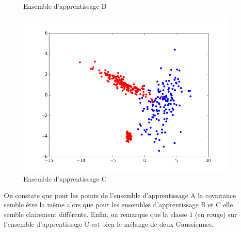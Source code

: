 \documentclass[paper=a4, fontsize=11pt]{article}
\begin{document}
\begin{figure}[h]
\begin{minipage}[b]{.3\linewidth}
  \caption*{Ensemble d'apprentissage B}
 \end{minipage} \hfill
 \begin{minipage}[b]{.3\linewidth}
  \includegraphics[scale=0.25]{figures/C_train.png}
  \caption*{Ensemble d'apprentissage C}
 \end{minipage}
\end{figure}

On constate que pour les points de l'ensemble d'apprentissage A la covariance semble être la même alors que pour les ensembles d'apprentissage B et C elle semble clairement différente. Enfin, on remarque que la classe $1$ (en rouge) sur l'ensemble d'apprentissage C est bien le mélange de deux Gaussiennes. 
\end{document}
